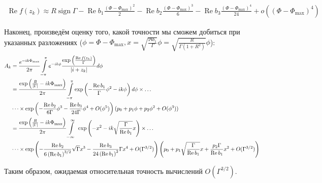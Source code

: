 \documentclass[a4paper, 12pt]{article}
\DeclareMathOperator*{\sign}{sign}
\DeclareMathOperator*{\Real}{Re}
\newenvironment{eqw}{\begin{equation} \begin{aligned}}   
    {\end{aligned}    \end{equation}}
\begin{document}
\begin{eqw}
    \Real f(z_k) \approx R\sign\Gamma - \Real b_1 \frac{\left(\Phi - \Phi_{\max}\right)^2}{2} - \Real b_2 \frac{\left(\Phi - \Phi_{\max}\right)^3}{6} - \Real b_3 \frac{\left(\Phi - \Phi_{\max}\right)^4}{24}+o\left(\left(\Phi - \Phi_{\max}\right)^4\right)
\end{eqw}

Наконец, произведём оценку того, какой точности мы сможем добиться при указанных разложениях ($\phi = \Phi - \Phi_{\max}, x=\sqrt{\frac{{\Re b_1}}{{\Gamma}}}\phi = \sqrt{\frac{R}{\Gamma\left(1+R^2\right)}}\phi$):
\begin{eqw}
     A_k &= \frac{e^{-ik\Phi_{\max}}}{2\pi}\int\limits_{-\pi}^\pi e^{-ik\phi} 
     \frac{\exp\left(\frac{\Real f(z_k)}{\Gamma}\right)}{\abs{i+z_k}}d\phi \\
    &=\frac{\exp\left(\frac{R}{\abs{\Gamma}}-ik\Phi_{\max}\right)}{2\pi}\int\limits_{-\pi}^\pi
    \exp\left(-\frac{\Real b_1}{\Gamma}\phi^2 -ik\phi \right)d\phi\times\dots\\
    &\dots\times\exp\left(-\frac{\Real b_2}{6\Gamma}\phi^3 - \frac{\Real b_3}{24\Gamma}\phi^4 + O(\phi^5)\right)(p_0 + p_1\phi + p_2\phi^2 + O(\phi^3)) \\
    &= \frac{\exp\left(\frac{R}{\abs{\Gamma}}-ik\Phi_{\max}\right)}{2\pi}\int\limits_{-\infty}^{\infty}\
    \exp\left(-x^2 - ik\sqrt{\frac{\Gamma}{\Real b_1}}x\right)\times\dots\\
    &\dots\times \exp\left(-\frac{\Real b_2}{6\left(\Real b_1\right)^{3/2}}\sqrt{\Gamma}x^3 - \frac{\Real b_3}{24\left(\Real b_1\right)^{2}}\Gamma x^4 + O(\Gamma^{3/2})\right)
    \left(p_0 + p_1\sqrt{\frac{\Gamma}{\Real b_1}}x +\frac{p_2\Gamma}{\Real b_1}x^2 + O(\Gamma^{3/2})\right)
\end{eqw}

Таким образом, ожидаемая относительная точность вычислений $O(\Gamma^{3/2})$.
\end{document}

